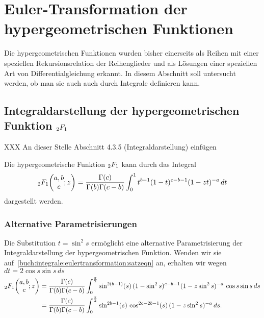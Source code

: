 %
%
%
\section{Euler-Transformation der hypergeometrischen Funktionen
\label{buch:integral:section:eulertransformation}}
Die hypergeometrischen Funktionen wurden bisher einerseits
als Reihen mit einer speziellen Rekursionsrelation der Reihenglieder
und als Lösungen einer speziellen Art von Differentialgleichung
erkannt.
In diesem Abschnitt soll untersucht werden, ob man sie auch
auch durch Integrale definieren kann.

%
%
\subsection{Integraldarstellung der hypergeometrischen Funktion
$\mathstrut_2F_1$}

XXX An dieser Stelle Abschnitt 4.3.5 (Integraldarstellung) einfügen

\begin{satz}[Euler]
\label{buch:integrale:eulertransformation:satz}
Die hypergeometrische Funktion $\mathstrut_2F_1$ kann durch das 
Integral
\begin{equation}
\mathstrut_2F_1\biggl(\begin{matrix}a,b\\c\end{matrix};z\biggr)
=
\frac{\Gamma(c)}{\Gamma(b)\Gamma(c-b)}
\int_0^1
t^{b-1}(1-t)^{c-b-1}(1-zt)^{-a}
\,dt
\label{buch:integrale:eulertransformation:satzeqn}
\end{equation}
dargestellt werden.
\end{satz}

\subsubsection{Alternative Parametrisierungen}
Die Substitution $t=\sin^2 s$ ermöglicht eine alternative Parametrisierung
der Integraldarstellung der hypergeometrischen Funktion.
Wenden wir sie auf~\eqref{buch:integrale:eulertransformation:satzeqn}
an, erhalten wir wegen $dt = 2\cos s\sin s\,ds$
\begin{align*}
\mathstrut_2F_1\biggl(\begin{matrix}a,b\\c\end{matrix};z\biggr)
&=
\frac{\Gamma(c)}{\Gamma(b)\Gamma(c-b)}
\int_0^{\frac{\pi}2}
\sin^{2(b-1)}(s)\,
(1-\sin^2s)^{c-b-1} (1-z\sin^2 s)^{-a}
\,\cos s\sin s
\,ds
\\
&=
\frac{\Gamma(c)}{\Gamma(b)\Gamma(c-b)}
\int_0^{\frac{\pi}2}
\sin^{2b-1}(s)\,\cos^{2c-2b-1}(s)\, (1-z\sin^2 s)^{-a}
\,ds.
\end{align*}


